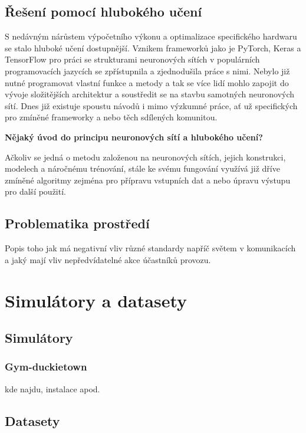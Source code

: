 \documentclass[czech, bc, kky, he, iso690alph]{fasthesis}
\begin{document}
        \section{Řešení pomocí hlubokého učení}
        	S nedávným nárůstem výpočetního výkonu a optimalizace specifického hardwaru se stalo hluboké učení dostupnější. Vznikem frameworků jako je PyTorch, Keras a TensorFlow pro práci se strukturami neuronových sítích v populárních programovacích jazycích se zpřístupnila a zjednodušila práce s nimi. Nebylo již nutné programovat vlastní funkce a metody a tak se více lidí mohlo zapojit do vývoje složitějších architektur a soustředit se na stavbu samotných neuronových sítí. Dnes již existuje spoustu návodů i mimo výzkumné práce, ať už specifických pro zmíněné frameworky a nebo těch sdílených komunitou.
            
            \textbf{Nějaký úvod do principu neuronových sítí a hlubokého učení?}
            
            
            
            Ačkoliv se jedná o metodu založenou na neuronových sítích, jejich konstrukci, modelech a náročnému trénování, stále ke svému fungování využívá již dříve zmíněné algoritmy zejména pro přípravu vstupních dat a nebo úpravu výstupu pro další použití. 
    	\section{Problematika prostředí}
    		Popis toho jak má negativní vliv různé standardy napříč světem v komunikacích a jaký mají vliv nepředvídatelné akce účastníků provozu.
    \chapter{Simulátory a datasety}
    	\section{Simulátory}
    		\subsection{Gym-duckietown}
    			kde najdu, instalace apod.
    	\section{Datasety}
\end{document}
